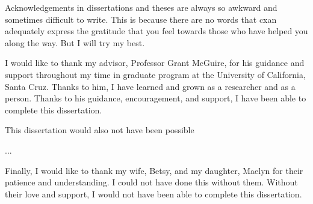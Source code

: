 \begin{acknowledgements}
    Acknowledgements in dissertations and theses are always so awkward and sometimes difficult to write. This is because there are no words that cxan adequately express the gratitude that you feel towards those who have helped you along the way. But I will try my best.
    
    I would like to thank my advisor, Professor Grant McGuire, for his guidance and support throughout my time in graduate program at the University of California, Santa Cruz. Thanks to him, I have learned and grown as a researcher and as a person. Thanks to his guidance, encouragement, and support, I have been able to complete this dissertation. 

    This dissertation would also not have been possible 

    ... 
    

    Finally, I would like to thank my wife, Betsy, and my daughter, Maelyn for their patience and understanding. I could not have done this without them. Without their love and support, I would not have been able to complete this dissertation.
\end{acknowledgements}

